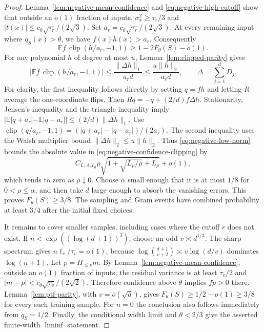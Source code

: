 \begin{proof}
Lemma~\ref{lem:negative-mean-confidence} and
\eqref{eq:negative-high-cutoff} show that outside an $o(1)$ fraction
of inputs, $\sigma_x^2\ge\tau_r/3$ and
$|t(x)|\le c_\theta\sqrt{\tau_r}/(2\sqrt3)$.
Set $a_r=c_\theta\sqrt{\tau_r}/(2\sqrt3)$.
At every remaining input where $q_S(x)>\theta$, we have
$f(x)h(x)>a_r$. Consequently
\begin{equation}\label{eq:negative-confidence-clipping}
 \mathbb E f\,\operatorname{clip}(h/a_r,-1,1)
 \ge1-2F_\theta(S)-o(1).
\end{equation}
For any polynomial $h$ of degree at most $u$,
Lemma~\ref{lem:clipped-parity} gives
\[
 \left|\mathbb E f\,\operatorname{clip}(h/a_r,-1,1)\right|
 \le\frac{\|\Delta h\|_1}{a_r d}
 \le\frac{u\|h\|_2}{a_r d},
 \qquad \Delta=\sum_{j=1}^dD_j.
\]
For clarity, the first inequality follows directly by setting $q=fh$
and letting $R$ average the one-coordinate flips. Then
$Rq=-q+(2/d)f\Delta h$. Stationarity, Jensen's inequality and the
triangle inequality imply
$|\mathbb E|q+a_r|-\mathbb E|q-a_r||
\le(2/d)\|\Delta h\|_1$.
Use $\operatorname{clip}(q/a_r,-1,1)
=(|q+a_r|-|q-a_r|)/(2a_r)$.
The second inequality uses the Walsh multiplier bound
$\|\Delta h\|_2\le u\|h\|_2$.
Thus \eqref{eq:negative-low-norm} bounds the absolute value in
\eqref{eq:negative-confidence-clipping} by
\[
 C_{L,A,c_\theta}\rho
       \sqrt{1+\sqrt{L_\rho/\rho}+L_\rho}+o(1),
\]
which tends to zero as $\rho\downarrow0$. Choose $\alpha$ small enough
that it is at most $1/8$ for $0<\rho\le\alpha$, and then take $d$
large enough to absorb the vanishing errors. This proves
$F_\theta(S)\ge3/8$. The sampling and Gram events have combined
probability at least $3/4$ after the initial fixed choices.

It remains to cover smaller samples, including cases where the cutoff
$r$ does not exist. If $n<\exp((\log(d+1))^3)$, choose an odd
$v\asymp d^{1/3}$. The sharp spectrum gives
$n\ell_v/\tau_v=o(1)$, because
$\log\binom{d+1}{v+2}\asymp v\log(d/v)$ dominates $\log(n+1)$.
Let $p=\Pi_{\le v}m$. By
Lemma~\ref{lem:negative-mean-confidence}, outside an $o(1)$ fraction
of inputs, the residual variance is at least $\tau_v/2$ and
$|m-p|<c_\theta\sqrt{\tau_v}/(2\sqrt2)$.
Therefore confidence above $\theta$ implies $fp>0$ there.
Lemma~\ref{lem:ptf-parity}, with $v=o(\sqrt d)$, gives
$F_\theta(S)\ge1/2-o(1)\ge3/8$ for every such training sample.
For $n=0$ the conclusion also follows immediately from $q_S=1/2$.
Finally, the conditional width limit and $\theta<2/3$ give the asserted
finite-width $\liminf$ statement.
\end{proof}
